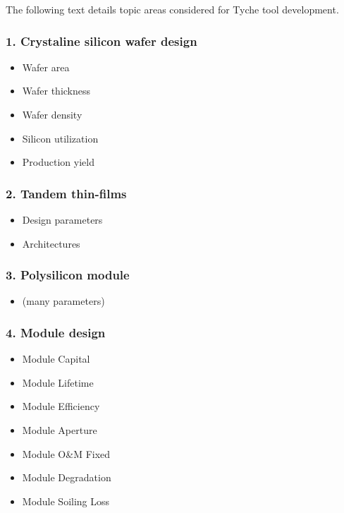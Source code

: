 \documentclass[letterpaper,10pt,english]{sphinxmanual}
\begin{document}
The following text details topic areas considered for Tyche tool
development.


\subsubsection{1. Crystaline silicon wafer design}
\label{\detokenize{approach:crystaline-silicon-wafer-design}}\begin{itemize}
\item {} 
Wafer area

\item {} 
Wafer thickness

\item {} 
Wafer density

\item {} 
Silicon utilization

\item {} 
Production yield

\end{itemize}


\subsubsection{2. Tandem thin-films}
\label{\detokenize{approach:tandem-thin-films}}\begin{itemize}
\item {} 
Design parameters

\item {} 
Architectures

\end{itemize}


\subsubsection{3. Polysilicon module}
\label{\detokenize{approach:polysilicon-module}}\begin{itemize}
\item {} 
(many parameters)

\end{itemize}


\subsubsection{4. Module design}
\label{\detokenize{approach:module-design}}\begin{itemize}
\item {} 
Module Capital

\item {} 
Module Lifetime

\item {} 
Module Efficiency

\item {} 
Module Aperture

\item {} 
Module O\&M Fixed

\item {} 
Module Degradation

\item {} 
Module Soiling Loss

\end{itemize}
\end{document}
